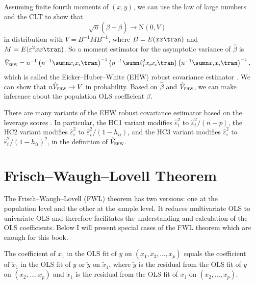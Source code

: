 Assuming finite fourth moments of $(x,y)$, we can use the law of large numbers and the CLT to show that 
$$
\sqrt{n}(\hat{\beta}-\beta)\rightarrow\text{N} ( 0, V )
$$
in distribution with $V =  B^{-1} M B^{-1}$,  where $B =   E(xx \tran ) $ and $M= E(\varepsilon^{2}xx \tran )$. 
So a moment estimator for the asymptotic variance of $\hat{\beta}$ is  
\begin{equation}\label{eq::v-hat-ehw}
\hat{V}_\textsc{ehw} =  
n^{-1}
\left(n^{-1}\sumn x_{i}x_{i} \tran \right)^{-1}
\left(n^{-1}\sumn  \hat{\varepsilon}_i^2  x_{i}x_{i} \tran \right) 
\left(n^{-1}\sumn x_{i}x_{i} \tran \right)^{-1} ,
\end{equation}
which is called the Eicker--Huber--White (EHW) robust covariance
estimator \citep{eicker1967limit, huber::1967, white::1980}. We can show that $n \hat{V}_\textsc{ehw}  \rightarrow  V$ in probability. Based on $\hat{\beta}$ and $\hat{V}_\textsc{ehw} $, we can make inference about the population OLS coefficient $\beta$.  


There are many variants of the EHW robust covariance estimator based on the leverage scores \citep{long2000using}. In particular, the HC1 variant modifies $\hat{\varepsilon}_i^2$ to $\hat{\varepsilon}_i^2/(n-p)$,
the HC2 variant modifies $\hat{\varepsilon}_i^2$ to $\hat{\varepsilon}_i^2 /(1 - h_{ii}) $, 
and
the HC3 variant modifies $\hat{\varepsilon}_i^2$ to $\hat{\varepsilon}_i^2/(1 - h_{ii})^2$, in the definition of $\hat{V}_\textsc{ehw}$. 

 


\section{Frisch--Waugh--Lovell Theorem}
\label{appendix::fwl-theorem}

The Frisch--Waugh--Lovell (FWL) theorem has two versions: one at the population level and the other at the sample level. It reduces multivariate OLS to univariate OLS and therefore facilitates the understanding and calculation of the OLS coefficients. Below I will present special cases of the FWL theorem which are enough for this book. 

\begin{theorem}
\label{thm::population-FWL}
The coefficient of $x_1$ in the OLS fit of $y$ on $(x_1, x_2, \ldots, x_p)$ equals the coefficient of $\tilde{x}_1$ in the OLS fit of $y$ or $\tilde{y}$ on $\tilde{x}_1$, where $\tilde{y}$ is the residual from the OLS fit of $y$ on $(x_2, \ldots, x_p)$ and $\tilde{x}_1$ is the residual from the OLS fit of $x_1$ on $(x_2, \ldots, x_p)$.
\end{theorem}


